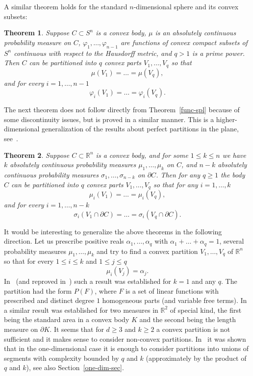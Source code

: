 \documentclass[12pt,a4paper,oneside]{amsart}
\newtheorem{thm}{Theorem}[section]
\theoremstyle{definition}
\theoremstyle{remark}
\numberwithin{equation}{section}
\renewcommand{\phi}{\varphi}
\begin{document}
A similar theorem holds for the standard $n$-dimensional sphere and its convex subsets:

\begin{thm}
\label{func-spl-sph}
Suppose $C\subset S^n$ is a convex body, $\mu$ is an absolutely continuous probability measure on $C$, $\phi_1, \ldots, \phi_{n-1}$ are functions of convex compact subsets of $S^n$ continuous with respect to the Hausdorff metric, and $q>1$ is a prime power. Then $C$ can be partitioned into $q$ convex parts $V_1,\ldots, V_q$ so that 
$$
\mu(V_1) = \dots = \mu(V_q),
$$
and for every $i = 1,\ldots, n-1$
$$
\phi_i(V_1) = \dots = \phi_i(V_q).
$$
\end{thm}

The next theorem does not follow directly from Theorem~\ref{func-spl} because of some discontinuity issues, but is proved in a similar manner. This is a higher-dimensional generalization of the results about perfect partitions in the plane, see~\cite{akknrtu2004}.

\begin{thm}
\label{vol-area-spl} 
Suppose $C\subset\mathbb R^n$ is a convex body, and for some $1\le k \le n$ we have $k$ absolutely continuous probability measures $\mu_1,\ldots, \mu_k$ on $C$, and $n-k$ absolutely continuous probability measures $\sigma_1,\ldots, \sigma_{n-k}$ on $\partial C$. Then for any $q\ge 1$ the body $C$ can be partitioned into $q$ convex parts $V_1,\ldots, V_q$ so that for any $i=1,\ldots, k$
$$
\mu_i(V_1) = \dots = \mu_i(V_q),
$$
and for every $i = 1,\ldots, n-k$
$$
\sigma_i(V_1\cap\partial C) = \dots = \sigma_i(V_q\cap\partial C).
$$
\end{thm}

It would be interesting to generalize the above theorems in the following direction. Let us prescribe positive reals $\alpha_1,\ldots, \alpha_q$ with $\alpha_1+\dots+\alpha_q = 1$, several probability measures $\mu_1, \ldots, \mu_k$ and try to find a convex partition $V_1, \ldots, V_q$ of $\mathbb R^n$ so that for every $1\le i\le k$ and $1\le j\le q$
$$
\mu_i(V_j) = \alpha_j.
$$
In~\cite{aah1998} (and reproved in~\cite{zivvre2001,kar2005}) such a result was established for $k=1$ and any $q$. The partition had the form $P(F)$, where $F$ is a set of linear functions with prescribed and distinct degree $1$ homogeneous parts (and variable free terms). In~\cite{kaka2002} a similar result was established for two measures in $\mathbb R^2$ of special kind, the first being the standard area in a convex body $K$ and the second being the length measure on $\partial K$. It seems that for $d\ge 3$ and $k\ge 2$ a convex partition is not sufficient and it makes sense to consider non-convex partitions. In~\cite{stwo1985,alon1987} it was shown that in the one-dimensional case it is enough to consider partitions into unions of segments with complexity bounded by $q$ and $k$ (approximately by the product of $q$ and $k$), see also Section~\ref{one-dim-sec}. 
\end{document}
